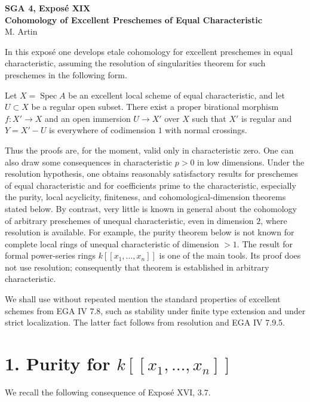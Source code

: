 \documentclass[12pt]{article}
\DeclareMathOperator{\Spec}{Spec}
\begin{document}
\newpage

\begin{center}
{\Large \textbf{SGA 4, Expos\'e XIX}}\\[0.35em]
{\large \textbf{Cohomology of Excellent Preschemes of Equal Characteristic}}\\[0.25em]
{\normalsize M. Artin}
\end{center}

\bigskip

In this expos\'e one develops etale cohomology for excellent preschemes in equal characteristic, assuming the resolution of singularities theorem for such preschemes in the following form.

Let $X=\Spec A$ be an excellent local scheme of equal characteristic, and let $U\subset X$ be a regular open subset. There exist a proper birational morphism $f:X'\to X$ and an open immersion $U\to X'$ over $X$ such that $X'$ is regular and $Y=X'-U$ is everywhere of codimension $1$ with normal crossings.

Thus the proofs are, for the moment, valid only in characteristic zero. One can also draw some consequences in characteristic $p>0$ in low dimensions. Under the resolution hypothesis, one obtains reasonably satisfactory results for preschemes of equal characteristic and for coefficients prime to the characteristic, especially the purity, local acyclicity, finiteness, and cohomological-dimension theorems stated below. By contrast, very little is known in general about the cohomology of arbitrary preschemes of unequal characteristic, even in dimension $2$, where resolution is available. For example, the purity theorem below is not known for complete local rings of unequal characteristic of dimension $>1$. The result for formal power-series rings $k[[x_1,\ldots,x_n]]$ is one of the main tools. Its proof does not use resolution; consequently that theorem is established in arbitrary characteristic.

We shall use without repeated mention the standard properties of excellent schemes from EGA IV 7.8, such as stability under finite type extension and under strict localization. The latter fact follows from resolution and EGA IV 7.9.5.

\section*{1. Purity for \texorpdfstring{$k[[x_1,\ldots,x_n]]$}{k[[x1,...,xn]]}}

We recall the following consequence of Expos\'e XVI, 3.7.
\end{document}
